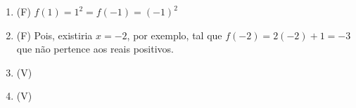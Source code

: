 \begin{enumerate}
		\item (F) $f(1)=1^2 =f(-1)=(-1)^2$
		\item (F) Pois, existiria $x=-2$, por exemplo, tal que $f(-2)=2(-2)+1=-3$ que não pertence aos reais positivos.
		\item (V) 
		\item (V) 
\end{enumerate}
